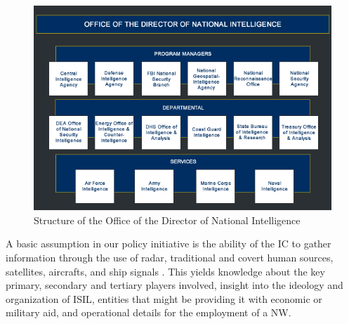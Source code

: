 \documentclass{report}
\begin{document}
\begin{figure}[h]
 \centering
 \includegraphics[trim = 0cm 0cm 0cm 0cm, clip,scale=0.7]{./figures/structure_infographic.jpg}
   \caption{Structure of the Office of the Director of National Intelligence \cite{OfficeoftheDirectorofNationalIntelligence}}
     \label{fig:structure_infographic}
\end{figure}

A basic assumption in our policy initiative is the ability of the IC to gather information through the use of radar, traditional and covert human sources, satellites, aircrafts, and ship signals \cite{Richelson2011}. This yields knowledge about the key primary, secondary and tertiary players involved, insight into the ideology and organization of ISIL, entities that might be providing it with economic or military aid, and operational details for the employment of a NW.
\end{document}
